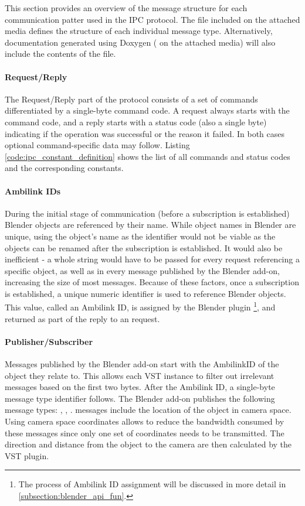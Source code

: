 This section provides an overview of the message structure for each communication patter used in the IPC protocol. 
The  file included on the attached media defines the structure of 
each individual message type. Alternatively, documentation generated using Doxygen ( on the attached media) 
will also include the contents of the file.

\paragraph*{Request/Reply}
The Request/Reply part of the  protocol consists of a set of commands differentiated by a single-byte command code.
A request always starts with the command code, and a reply starts with a status code (also a single byte) indicating if the operation was successful
or the reason it failed. In both cases optional command-specific data may follow. 
Listing \ref{code:ipc_constant_definition} shows the list of all commands and status codes and the corresponding constants.

\paragraph*{Ambilink IDs}
During the initial stage of communication (before a subscription is established) Blender objects are referenced by their name.
While object names in Blender are unique, using the object's name as the identifier would not be viable as the objects 
can be renamed after the subscription is established.
It would also be inefficient - a whole string would have to be passed for every request referencing a specific object,
as well as in every message published by the Blender add-on, increasing the size of most messages.
Because of these factors, once a subscription is established, a unique numeric identifier is used to reference Blender objects.
This value, called an Ambilink ID, is assigned by the Blender plugin
\footnote{The process of Ambilink ID assignment will be discussed in more detail in \ref{subsection:blender_api_fun}.},
and returned as part of the reply to an  request.

\paragraph*{Publisher/Subscriber}
Messages published by the Blender add-on start with the AmbilinkID of the object they relate to.
This allows each VST instance to filter out irrelevant messages based on the first two bytes.
After the Ambilink ID, a single-byte message type identifier follows. The Blender add-on publishes the following message types:
, , . 
 messages include the location of the object in camera space. 
Using camera space coordinates allows to reduce the bandwidth consumed by these messages 
since only one set of coordinates needs to be transmitted. The direction and distance from the object
to the camera are then calculated by the VST plugin.

